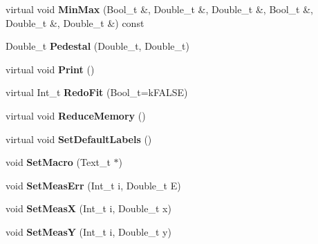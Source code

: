 \begin{DoxyCompactItemize}
\item 
\hypertarget{classTSplineFit_a1587e51646bff1ce59431bb5c50a2ed5}{virtual void {\bfseries Min\-Max} (Bool\-\_\-t \&, Double\-\_\-t \&, Double\-\_\-t \&, Bool\-\_\-t \&, Double\-\_\-t \&, Double\-\_\-t \&) const }\label{classTSplineFit_a1587e51646bff1ce59431bb5c50a2ed5}

\item 
\hypertarget{classTSplineFit_a7588873942e58c23fdc451f65cb4d8c6}{Double\-\_\-t {\bfseries Pedestal} (Double\-\_\-t, Double\-\_\-t)}\label{classTSplineFit_a7588873942e58c23fdc451f65cb4d8c6}

\item 
\hypertarget{classTSplineFit_a65e9cef2d8660b9f03cbe960e569d7f1}{virtual void {\bfseries Print} ()}\label{classTSplineFit_a65e9cef2d8660b9f03cbe960e569d7f1}

\item 
\hypertarget{classTSplineFit_ade52a4777e01b3bfca21aaa47245d020}{virtual Int\-\_\-t {\bfseries Redo\-Fit} (Bool\-\_\-t=k\-F\-A\-L\-S\-E)}\label{classTSplineFit_ade52a4777e01b3bfca21aaa47245d020}

\item 
\hypertarget{classTSplineFit_a3eac6adf262a621ea7a05c5713fde3c7}{virtual void {\bfseries Reduce\-Memory} ()}\label{classTSplineFit_a3eac6adf262a621ea7a05c5713fde3c7}

\item 
\hypertarget{classTSplineFit_a7cbb94997b5067dea37ce34d34634a7f}{virtual void {\bfseries Set\-Default\-Labels} ()}\label{classTSplineFit_a7cbb94997b5067dea37ce34d34634a7f}

\item 
\hypertarget{classTSplineFit_a2ed3cf463bb807aa598e3a4576dc569e}{void {\bfseries Set\-Macro} (Text\-\_\-t $\ast$)}\label{classTSplineFit_a2ed3cf463bb807aa598e3a4576dc569e}

\item 
\hypertarget{classTSplineFit_a0bece7c59cc2d3d76b4f764d0d4aac8e}{void {\bfseries Set\-Meas\-Err} (Int\-\_\-t i, Double\-\_\-t E)}\label{classTSplineFit_a0bece7c59cc2d3d76b4f764d0d4aac8e}

\item 
\hypertarget{classTSplineFit_af9be30021edba4238f4719871bc41678}{void {\bfseries Set\-Meas\-X} (Int\-\_\-t i, Double\-\_\-t x)}\label{classTSplineFit_af9be30021edba4238f4719871bc41678}

\item 
\hypertarget{classTSplineFit_a2dbd5269912a1c7f57b4854a89074abe}{void {\bfseries Set\-Meas\-Y} (Int\-\_\-t i, Double\-\_\-t y)}\label{classTSplineFit_a2dbd5269912a1c7f57b4854a89074abe}


\end{DoxyCompactItemize}
